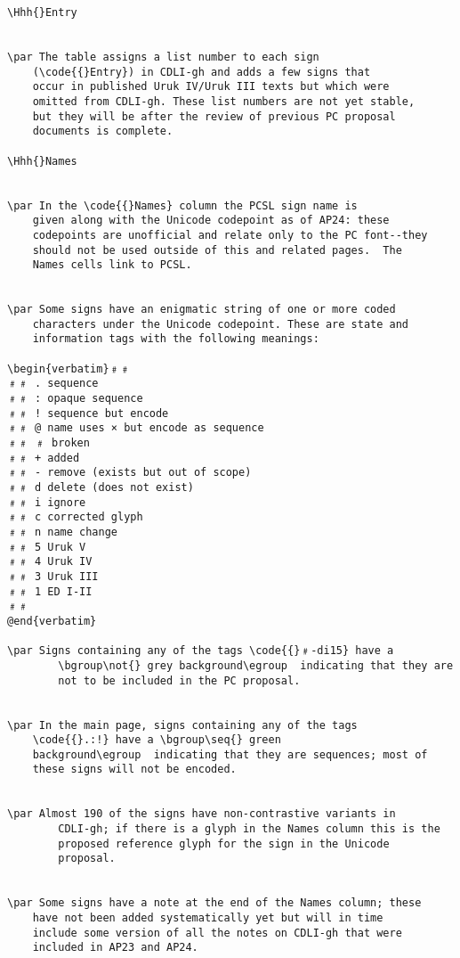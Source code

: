 \begin{verbatim}
\Hhh{}Entry


\par The table assigns a list number to each sign
	(\code{{}Entry}) in CDLI-gh and adds a few signs that
	occur in published Uruk IV/Uruk III texts but which were
	omitted from CDLI-gh. These list numbers are not yet stable,
	but they will be after the review of previous PC proposal
	documents is complete.

\Hhh{}Names


\par In the \code{{}Names} column the PCSL sign name is
	given along with the Unicode codepoint as of AP24: these
	codepoints are unofficial and relate only to the PC font--they
	should not be used outside of this and related pages.  The
	Names cells link to PCSL.


\par Some signs have an enigmatic string of one or more coded
	characters under the Unicode codepoint. These are state and
	information tags with the following meanings:

\begin{verbatim}﹟﹟
﹟﹟ . sequence
﹟﹟ : opaque sequence
﹟﹟ ! sequence but encode
﹟﹟ @ name uses × but encode as sequence
﹟﹟ ﹟ broken
﹟﹟ + added
﹟﹟ - remove (exists but out of scope)
﹟﹟ d delete (does not exist)
﹟﹟ i ignore
﹟﹟ c corrected glyph
﹟﹟ n name change
﹟﹟ 5 Uruk V
﹟﹟ 4 Uruk IV
﹟﹟ 3 Uruk III
﹟﹟ 1 ED I-II
﹟﹟
@end{verbatim}

\par Signs containing any of the tags \code{{}﹟-di15} have a
        \bgroup\not{} grey background\egroup  indicating that they are
        not to be included in the PC proposal.


\par In the main page, signs containing any of the tags
	\code{{}.:!} have a \bgroup\seq{} green
	background\egroup  indicating that they are sequences; most of
	these signs will not be encoded.


\par Almost 190 of the signs have non-contrastive variants in
        CDLI-gh; if there is a glyph in the Names column this is the
        proposed reference glyph for the sign in the Unicode
        proposal.


\par Some signs have a note at the end of the Names column; these
	have not been added systematically yet but will in time
	include some version of all the notes on CDLI-gh that were
	included in AP23 and AP24.


\end{verbatim}
